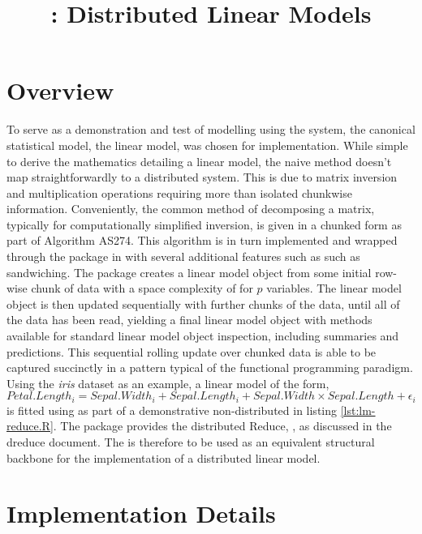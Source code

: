 \documentclass[a4paper, 10pt]{article}
\begin{document}
\title{: Distributed Linear Models}
  
\maketitle

\section{Overview}

To serve as a demonstration and test of modelling using the \lsr{} system, the canonical statistical model, the linear model, was chosen for implementation.
While simple to derive the mathematics detailing a linear model, the naive method doesn't map straightforwardly to a distributed system.
This is due to matrix inversion and multiplication operations requiring more than isolated chunkwise information.
Conveniently, the common method of decomposing a matrix, typically for computationally simplified inversion, is given in a chunked form as part of Algorithm AS274\cite{miller1992as274}.
This algorithm is in turn implemented and wrapped through the  package in \R{} with several additional features such as such as sandwiching\cite{lumley2013biglm}.
The  package creates a linear model object from some initial row-wise chunk of data with a space complexity of  for $p$ variables.
The linear model object is then updated sequentially with further chunks of the data, until all of the data has been read, yielding a final linear model object with methods available for standard linear model object inspection, including summaries and predictions.
This sequential rolling update over chunked data is able to be captured succinctly in a  pattern typical of the functional programming paradigm.
Using the \textit{iris} dataset as an example, a linear model of the form, 
$$ Petal.Length_i = Sepal.Width_i + Sepal.Length_i + Sepal.Width \times Sepal.Length + \epsilon_i$$
is fitted using  as part of a demonstrative non-distributed  in listing \ref{lst:lm-reduce.R}.
The \lsr{} package provides the distributed Reduce, , as discussed in the dreduce document.
The  is therefore to be used as an equivalent structural backbone for the implementation of a distributed linear model.

\section{Implementation Details}
\end{document}
